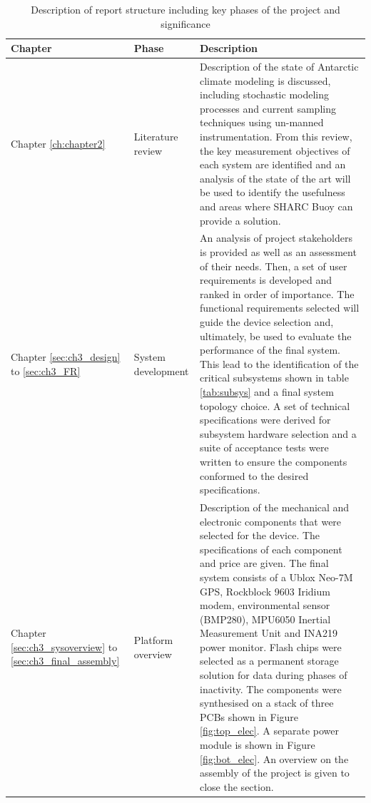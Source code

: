 \begin{center}
   {\setlength{\extrarowheight}{5pt}%
   	\footnotesize
    \begin{longtable}[H]{>{\centering}m{} >{\centering}m{}  
   m{}}
        \caption{Description of report structure including key phases of the project and
        significance}
        \label{tab:report_structure}\\
        \hline
        \textbf{Chapter} & \textbf{Phase} & \textbf{Description} \\
        \hline
        \hline
        Chapter \ref{ch:chapter2} & Literature review & Description of the state of Antarctic climate modeling is discussed, including stochastic modeling processes and current sampling techniques using un-manned instrumentation. From this review, the key measurement objectives of each system are identified and an analysis of the state of the art will be used to identify the usefulness and areas where SHARC Buoy can provide a solution. \\
        \hline
        Chapter \ref{sec:ch3_design} to \ref{sec:ch3_FR} & System development &  An analysis of project stakeholders is provided as well as an assessment of their needs. Then, a set of user requirements is developed and ranked in order of importance. The functional requirements selected will guide the device selection and, ultimately, be used to evaluate the performance of the final system. This lead to the identification of the critical subsystems shown in table \ref{tab:subsys} and a final system topology choice. A set of technical specifications were derived for subsystem hardware selection and a suite of acceptance tests were written to ensure the components conformed to the desired specifications.\\
        \hline
        Chapter \ref{sec:ch3_sysoverview} to \ref{sec:ch3_final_assembly} & Platform overview & Description of the mechanical and electronic components that were selected for the device. The specifications of each component and price are given. The final system consists of a Ublox Neo-7M GPS, Rockblock 9603 Iridium modem, environmental sensor (BMP280), MPU6050 Inertial Measurement Unit and INA219 power monitor. Flash chips were selected as a permanent storage solution for data during phases of inactivity. The components were synthesised on a stack of three PCBs shown in Figure \ref{fig:top_elec}. A separate power module is shown in Figure \ref{fig:bot_elec}. An overview on the assembly of the project is given to close the section.\\

\end{longtable}}
\end{center}
